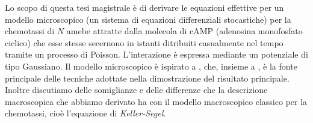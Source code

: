 Lo scopo di questa tesi magistrale è di derivare le equazioni effettive per un modello microscopico (un sistema di equazioni differenziali stocastiche) per la chemotassi di $N$ amebe attratte dalla molecola di cAMP (adenosina monofosfato ciclico) che esse stesse secernono in istanti ditribuiti casualmente nel tempo tramite un processo di Poisson.
L'interazione è espressa mediante un potenziale di tipo Gaussiano.
Il modello microscopico è ispirato a \cite{ana}, che, insieme a \cite{peter-boers}, è la fonte principale delle tecniche adottate nella dimostrazione del risultato principale.
Inoltre discutiamo delle somiglianze e delle differenze che la descrizione macroscopica che abbiamo derivato ha con il modello macroscopico classico per la chemotassi, cioè l'equazione di \emph{Keller-Segel}.